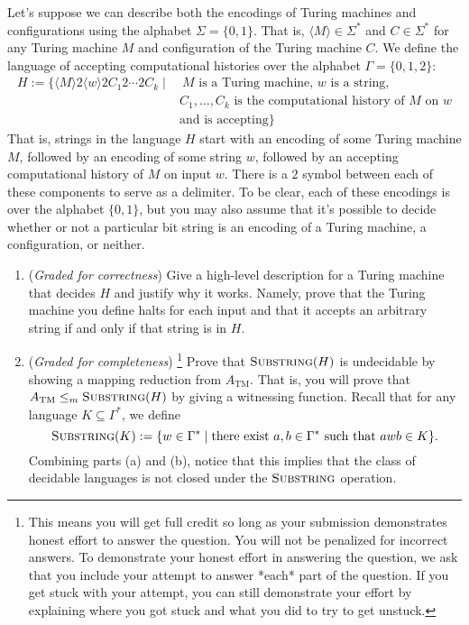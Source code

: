 \documentclass[12pt, oneside]{article}
\newcommand{\gradeCorrect}{({\it Graded for correctness}) }
\newcommand{\gradeComplete}{({\it Graded for completeness}) }
\newcommand{\gradeCompleteFirst}{\gradeComplete\footnote{This means you will 
get full credit so long as your submission demonstrates honest effort to 
answer the question. You will not be penalized for incorrect answers. 
To demonstrate your honest effort in answering the question, we ask 
that you include your attempt to answer *each* part of the question. 
If you get stuck with your attempt, you can still demonstrate 
your effort by explaining where you got stuck and what 
you did to try to get unstuck.} }
\newcommand{\SUBSTRING}{\textsc{Substring}}
\begin{document}
\begin{enumerate}
Let's suppose we can describe both the encodings of Turing 
machines and configurations using the alphabet 
$\Sigma = \{0,1\}$. 
That is, $\langle M \rangle \in \Sigma^*$ and $C \in 
\Sigma^*$ for any Turing machine $M$ and configuration of the 
Turing machine $C$. We  define the language of accepting 
computational histories over the alphabet $\Gamma = \{0,1, 
2\}$:
\begin{align*}
H:= \{ \langle M \rangle 2 \langle w \rangle 2 C_1 2 \cdots 2 C_k \mid& ~M \textrm{ is a Turing machine, $w$ is a string,} \\
&C_1, \ldots, C_k \text{ is the computational history of } M \text{ on } w \\
&\text{and is accepting} \}
\end{align*}
That is, strings in the language $H$ start with an encoding of 
some Turing machine $M$, followed by an encoding of 
some string $w$, followed by an accepting computational 
history of $M$ on input $w$. There is a $2$ symbol between 
each of these components to serve as a delimiter. To be clear, 
each of these encodings is over the alphabet $\{0,1\}$, but 
you may also assume that it's possible to decide whether or 
not a particular bit string is an encoding of a Turing 
machine, a configuration, or neither.

\begin{enumerate}
\item\gradeCorrect Give a high-level description for 
a Turing machine that decides $H$ and justify 
why it works. Namely, prove that the Turing machine 
you define halts for each input and that it accepts
an arbitrary string if and only if that string is in $H$.
\item\gradeCompleteFirst Prove that $\SUBSTRING(H)$ is undecidable by showing a mapping reduction from $A_{\mathrm{TM}}$. That is, you will 
prove that $A_{\mathrm{TM}} \le_m \SUBSTRING(H)$
by giving a witnessing function. Recall that for any language $K \subseteq \Gamma^*$, we define 
\[
    \SUBSTRING(K) := \{ w \in \Gamma^* \mid \text{there exist } a,b \in \Gamma^* \text{ such that } awb \in K\}.
\]
Combining parts (a) and (b), notice that this implies that the 
class of decidable languages is not closed under the 
$\SUBSTRING$ operation. 

\end{enumerate}

\end{enumerate}

\newpage
\titleformat{\subsubsection}[runin]
   {\normalfont\bfseries}{}{}{}
   
\end{document}
